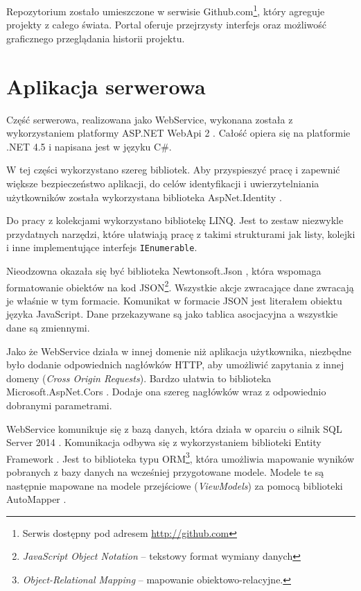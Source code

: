 \documentclass[a4paper]{book}
\begin{document}
			Repozytorium zostało umieszczone w serwisie Github.com\footnote{Serwis dostępny pod adresem \url{http://github.com}}, który agreguje projekty z całego świata. Portal oferuje przejrzysty interfejs oraz możliwość graficznego przeglądania historii projektu.
		
		\section{Aplikacja serwerowa}
		
		Część serwerowa, realizowana jako WebService, wykonana została z wykorzystaniem platformy ASP.NET WebApi 2 \cite{id:WebApi}. Całość opiera się na platformie .NET 4.5 i napisana jest w języku C\#.
		
		W tej części wykorzystano szereg bibliotek. Aby przyspieszyć pracę i zapewnić większe bezpieczeństwo aplikacji, do celów identyfikacji i uwierzytelniania użytkowników została wykorzystana biblioteka AspNet.Identity \cite{id:ASPIdentity}.
		
		Do pracy z kolekcjami wykorzystano bibliotekę LINQ. Jest to zestaw niezwykle przydatnych narzędzi, które ułatwiają pracę z takimi strukturami jak listy, kolejki i inne implementujące interfejs \texttt{IEnumerable}.
		
		Nieodzowna okazała się być biblioteka Newtonsoft.Json \cite{id:NewtonsoftJSON}, która wspomaga formatowanie obiektów na kod JSON\footnote{\emph{JavaScript Object Notation} -- tekstowy format wymiany danych}. Wszystkie akcje zwracające dane zwracają je właśnie w tym formacie. Komunikat w formacie JSON jest literałem obiektu języka JavaScript. Dane przekazywane są jako tablica asocjacyjna a wszystkie dane są zmiennymi.
		
		Jako że WebService działa w innej domenie niż aplikacja użytkownika, niezbędne było dodanie odpowiednich nagłówków HTTP, aby umożliwić zapytania z innej domeny (\emph{Cross Origin Requests}). Bardzo ułatwia to biblioteka Microsoft.AspNet.Cors \cite{id:ASPCors}. Dodaje ona szereg nagłówków wraz z odpowiednio dobranymi parametrami.
		
		WebService komunikuje się z bazą danych, która działa w oparciu o silnik SQL Server 2014 \cite{id:SQLServer}. Komunikacja odbywa się z wykorzystaniem biblioteki Entity Framework \cite{id:EntityFramework}. Jest to biblioteka typu ORM\footnote{\emph{Object-Relational Mapping} -- mapowanie obiektowo-relacyjne. },
		która umożliwia mapowanie wyników pobranych z bazy danych na wcześniej przygotowane modele. Modele te są następnie mapowane na modele przejściowe (\emph{ViewModels}) za pomocą biblioteki AutoMapper \cite{id:Automapper}.
		
\end{document}
